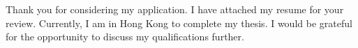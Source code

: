 \documentclass[11pt, a4paper]{awesome-cv}
\begin{document}
\begin{cvletter}
Thank you for considering my application. I have attached my resume for your review. Currently, I am in Hong Kong to complete my thesis. I would be grateful for the opportunity to discuss my qualifications further.


\end{cvletter}


\makeletterclosing
\end{document}
